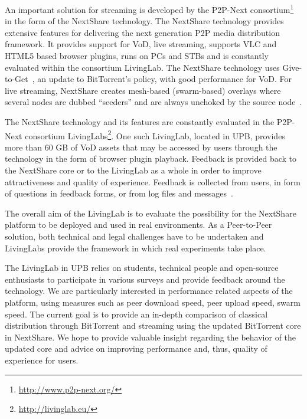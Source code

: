 An important solution for streaming is developed by the P2P-Next
consortium\footnote{\url{http://www.p2p-next.org/}} in the form of the NextShare
technology. The NextShare technology provides extensive features for
delivering the next generation P2P media distribution framework. It provides
support for VoD, live streaming, supports VLC and HTML5 based browser plugins,
runs on PCs and STBs and is constantly evaluated within the consortium
LivingLab. The NextShare technology uses Give-to-Get~\cite{give-to-get}, an
update to BitTorrent's policy, with good performance for VoD. For live
streaming, NextShare creates mesh-based (swarm-based) overlays where several
nodes are dubbed ``seeders'' and are always unchoked by the source
node~\cite{design-p2p-live}.

The NextShare technology and its features are constantly evaluated in the
P2P-Next consortium LivingLabs\footnote{\url{http://livinglab.eu/}}. One such
LivingLab, located in UPB, provides more than 60 GB of VoD assets that may be
accessed by users through the technology in the form of browser plugin
playback.  Feedback is provided back to the NextShare core or to the LivingLab
as a whole in order to improve attractiveness and quality of experience.
Feedback is collected from users, in form of questions in feedback forms, or
from log files and messages~\cite{bt-swarm-analysis}.

The overall aim of the LivingLab is to evaluate the possibility for the
NextShare platform to be deployed and used in real environments. As a
Peer-to-Peer solution, both technical and legal challenges have to be
undertaken and LivingLabs provide the framework in which real experiments
take place.

The LivingLab in UPB relies on students, technical people and open-source
enthusiasts to participate in various surveys and provide feedback around the
technology. We are particularly interested in performance related aspects of
the platform, using measures such as peer download speed, peer upload speed,
swarm speed. The current goal is to provide an in-depth comparison of
classical distribution through BitTorrent and streaming using the updated
BitTorrent core in NextShare. We hope to provide valuable insight regarding
the behavior of the updated core and advice on improving performance and,
thus, quality of experience for users.

